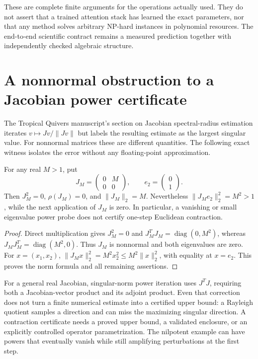 These are complete finite arguments for the operations actually used.
They do not assert that a trained attention stack has learned the exact
parameters, nor that any method solves arbitrary NP-hard instances in
polynomial resources. The end-to-end scientific contract remains a measured
prediction together with independently checked algebraic structure.

\section{A nonnormal obstruction to a Jacobian power certificate}

The Tropical Quivers manuscript's section on Jacobian spectral-radius
estimation iterates $v\mapsto Jv/\|Jv\|$ but labels the resulting estimate
as the largest singular value. For nonnormal matrices these are different
quantities. The following exact witness isolates the error without any
floating-point approximation.

\begin{proposition}
\label{prop:nonnormal-jvp}
For any real $M>1$, put
\[
 J_M=\begin{pmatrix}0&M\\0&0\end{pmatrix},\qquad
 e_2=\begin{pmatrix}0\\1\end{pmatrix}.
\]
Then $J_M^2=0$, $\rho(J_M)=0$, and $\|J_M\|_2=M$.
Nevertheless $\|J_Me_2\|_2^2=M^2>1$, while the next application of
$J_M$ is zero. In particular, a vanishing or small eigenvalue power probe
does not certify one-step Euclidean contraction.
\end{proposition}
\begin{proof}
Direct multiplication gives $J_M^2=0$ and
$J_M^TJ_M=\operatorname{diag}(0,M^2)$, whereas
$J_MJ_M^T=\operatorname{diag}(M^2,0)$. Thus $J_M$ is nonnormal and
both eigenvalues are zero. For $x=(x_1,x_2)$,
$\|J_Mx\|_2^2=M^2x_2^2\le M^2\|x\|_2^2$, with equality at
$x=e_2$. This proves the norm formula and all remaining assertions.
\end{proof}

For a general real Jacobian, singular-norm power iteration uses
$J^TJ$, requiring both a Jacobian-vector product and its adjoint product.
Even that correction does not turn a finite numerical estimate into a
certified upper bound: a Rayleigh quotient samples a direction and can
miss the maximizing singular direction. A contraction certificate needs a
proved upper bound, a validated enclosure, or an explicitly controlled
operator parametrization. The nilpotent example can have powers that
eventually vanish while still amplifying perturbations at the first step.

